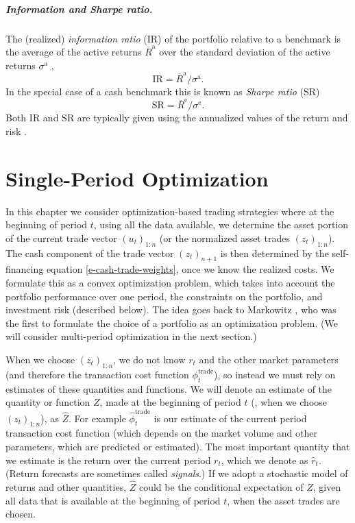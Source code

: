 \documentclass[openany]{article}  %
\newcommand{\SR}{\mathrm{SR}}
\newcommand{\IR}{\mathrm{IR}}
\newcommand{\trcost}{\phi^\mathrm{trade}}
\newcommand{\trcosthat}{\hat \phi^\mathrm{trade}}
\newcommand{\Rep}{R^\mathrm{e}}
\newcommand{\Rap}{R^\mathrm{a}}
\begin{document}
\paragraph{Information and Sharpe ratio.}
The (realized) \emph{information ratio} (IR) of the portfolio relative
to a benchmark is the average of the
active returns $\overline \Rap$ over the standard deviation of the
active returns $\sigma^\mathrm{a}$ \cite{grinold1999active},
\[
\IR = \overline \Rap / \sigma^\mathrm{a}.
\]
In the special case of a cash benchmark this is known as \emph{Sharpe ratio} (SR)
\cite{sharpe1966,sharpe1994}
\[
\SR = \overline \Rep / \sigma^\mathrm{e}.
\]
Both $\IR$ and $\SR$ are typically given using the annualized
values of the return and risk \cite{bacon2008practical}.


\chapter{Single-Period Optimization}
\label{s-spo}

In this chapter we consider optimization-based trading strategies
where at the beginning of period $t$, using all the data available,
we determine the asset portion of the current trade vector $(u_t)_{1:n}$
(or the normalized asset trades $(z_t)_{1:n}$).
The cash component of the trade vector $(z_t)_{n+1}$
is then determined by the self-financing equation \eqref{e-cash-trade-weights},
once we know the realized costs.
We formulate this as a convex optimization problem,
which takes into account the portfolio performance over one period,
the constraints on the portfolio, and investment risk (described below).
The idea goes back to Markowitz \cite{markowitz1952portfolio},
who was the first to formulate the choice of a portfolio
as an optimization problem.
(We will consider multi-period optimization in the next section.)


When we choose $(z_t)_{1:n}$, we do not know $r_t$ and the other
market parameters (and therefore the transaction cost function $\trcost_t$), so
instead we must rely on estimates of these quantities and functions.
We will denote an estimate of the quantity or function $Z$, made at the beginning
of period $t$
(\ie, when we choose $(z_t)_{1:n}$), as $\hat Z$.
For example $\trcosthat_t$ is our
estimate of the current period transaction cost function
(which depends on the market volume and other parameters,
which are predicted or estimated).
The most important quantity that we estimate is the return over the
current period $r_t$, which we denote as $\hat r_t$.
(Return forecasts are sometimes called \emph{signals}.)
If we adopt a stochastic model of returns and other quantities,
$\hat Z$ could be the conditional
expectation of $Z$, given all data that is available
at the beginning of period $t$, when the asset trades are chosen.
\end{document}
